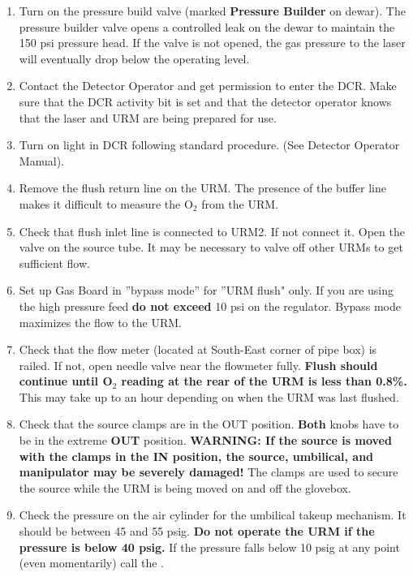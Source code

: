 \documentclass[11pt]{article}
\begin{document}
\begin{enumerate}
\item \CheckBox[name=rluo3]{} Turn on the pressure build valve (marked {\bf Pressure Builder} on dewar). The pressure builder valve opens a controlled leak on the dewar to maintain the 150 psi pressure head. If the valve is not opened, the gas pressure to the laser will eventually drop below the operating level.
\item \CheckBox[name=rluo4]{} Contact the Detector Operator and get permission to enter the DCR. Make sure that the DCR activity bit is set and that the detector operator knows that the laser and URM are being prepared for use. 
\item \CheckBox[name=rluo5]{} Turn on light in DCR following standard procedure. (See Detector Operator Manual).
\item {} Remove the flush return line on the URM. The presence of the buffer line makes it difficult to measure the O$_{2}$ from the URM.
\item {} Check that flush inlet line is connected to URM2. If not connect it. Open the valve on the source tube. It may be necessary to valve off other URMs to get sufficient flow.
\item {} Set up Gas Board in ''bypass mode'' for ''URM flush" only. If you are using the high pressure feed {\bf do not exceed} 10 psi on the regulator. Bypass mode maximizes the flow to the URM.
\item {} Check that the flow meter (located at South-East corner of pipe box) is railed. If not, open needle valve near the flowmeter fully. {\bf Flush should continue until O$_{2}$ reading at the rear of the URM is less than 0.8\%.} This may take up to an hour depending on when the URM was last flushed.
\item \CheckBox[name=rluo10]{} Check that the source clamps are in the OUT position. {\bf Both} knobs have to be in the extreme {\bf OUT} position. {\bf WARNING: If the source is moved with the clamps in the IN position, the source, umbilical, and manipulator may be severely damaged!} The clamps are used to secure the source while the URM is being moved on and off the glovebox.
\item \CheckBox[name=rluo11]{} Check the pressure on the air cylinder for the umbilical takeup mechanism. It should be between 45 and 55 psig. {\bf Do not operate the URM if the pressure is below 40 psig.} If the pressure falls below 10 psig at any point (even momentarily) call the .

\end{enumerate}
\end{document}
